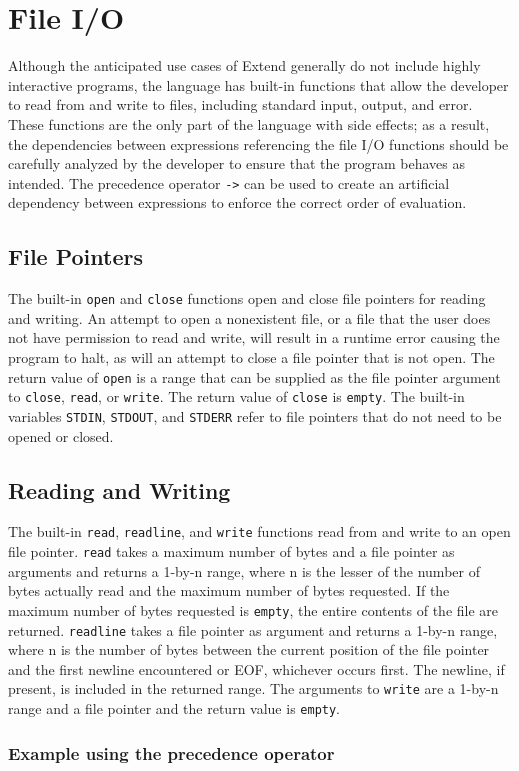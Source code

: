 \section{File I/O}
\label{sec:IO}
Although the anticipated use cases of Extend generally do not include highly interactive programs, the language has built-in functions that allow the developer to read from and write to files, including standard input, output, and error. These functions are the only part of the language with side effects; as a result, the dependencies between expressions referencing the file I/O functions should be carefully analyzed by the developer to ensure that the program behaves as intended. The precedence operator \texttt{->} can be used to create an artificial dependency between expressions to enforce the correct order of evaluation.
\subsection{File Pointers}
The built-in \texttt{open} and \texttt{close} functions open and close file pointers for reading and writing. An attempt to open a nonexistent file, or a file that the user does not have permission to read and write, will result in a runtime error causing the program to halt, as will an attempt to close a file pointer that is not open. The return value of \texttt{open} is a range that can be supplied as the file pointer argument to \texttt{close}, \texttt{read}, or \texttt{write}. The return value of \texttt{close} is \texttt{empty}. The built-in variables \texttt{STDIN}, \texttt{STDOUT}, and \texttt{STDERR} refer to file pointers that do not need to be opened or closed.
\subsection{Reading and Writing}
The built-in \texttt{read}, \texttt{readline}, and \texttt{write} functions read from and write to an open file pointer.  \texttt{read} takes a maximum number of bytes and a file pointer as arguments and returns a 1-by-n range, where n is the lesser of the number of bytes actually read and the maximum number of bytes requested. If the maximum number of bytes requested is \texttt{empty}, the entire contents of the file are returned. \texttt{readline} takes a file pointer as argument and returns a 1-by-n range, where n is the number of bytes between the current position of the file pointer and the first newline encountered or EOF, whichever occurs first. The newline, if present, is included in the returned range. The arguments to \texttt{write} are a 1-by-n range and a file pointer and the return value is \texttt{empty}.
\subsubsection{Example using the precedence operator}

